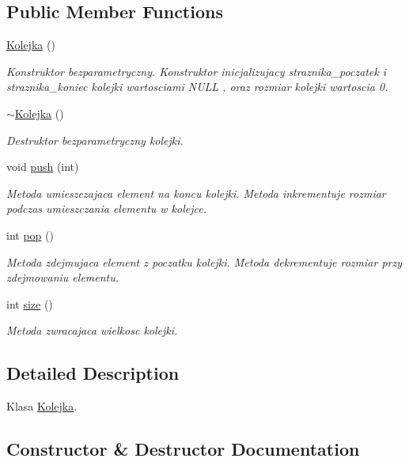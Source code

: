 \subsection*{Public Member Functions}
\begin{DoxyCompactItemize}
\item 
\hyperlink{a00011_a37c886fdc73dce62b04da0381dec5484}{Kolejka} ()
\begin{DoxyCompactList}\small\item\em Konstruktor bezparametryczny. Konstruktor inicjalizujacy straznika\+\_\+poczatek i straznika\+\_\+koniec kolejki wartosciami N\+U\+L\+L , oraz rozmiar kolejki wartoscia 0. \end{DoxyCompactList}\item 
\hyperlink{a00011_a352f86ff08cd47be6c35c60bb0f873a6}{$\sim$\+Kolejka} ()
\begin{DoxyCompactList}\small\item\em Destruktor bezparametryczny kolejki. \end{DoxyCompactList}\item 
void \hyperlink{a00011_abdd1c95eb88905167ec26658b6b76611}{push} (int)
\begin{DoxyCompactList}\small\item\em Metoda umieszczajaca element na koncu kolejki. Metoda inkrementuje rozmiar podczas umieszczania elementu w kolejce. \end{DoxyCompactList}\item 
int \hyperlink{a00011_aa99d7c7459116c2331b301637b45b666}{pop} ()
\begin{DoxyCompactList}\small\item\em Metoda zdejmujaca element z poczatku kolejki. Metoda dekrementuje rozmiar przy zdejmowaniu elementu. \end{DoxyCompactList}\item 
int \hyperlink{a00011_a82920d7b90e967a4d5e175a20fe6de68}{size} ()
\begin{DoxyCompactList}\small\item\em Metoda zwracajaca wielkosc kolejki. \end{DoxyCompactList}\end{DoxyCompactItemize}


\subsection{Detailed Description}
Klasa \hyperlink{a00011}{Kolejka}. 

\subsection{Constructor \& Destructor Documentation}
\hypertarget{a00011_a37c886fdc73dce62b04da0381dec5484}{}
